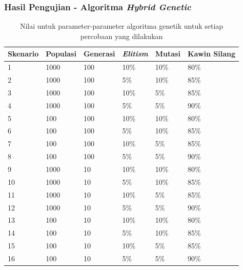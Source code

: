 \documentclass{beamer}
\begin{document}
\begin{frame}
\frametitle{Hasil Pengujian - Algoritma \textit{Hybrid Genetic}}
\begin{table}
\tiny
\centering
\captionsetup{justification=centering}
\caption[Nilai untuk parameter-parameter algoritma genetik untuk setiap percobaan yang dilakukan]{Nilai untuk parameter-parameter algoritma genetik untuk setiap percobaan yang dilakukan}
\begin{tabular}{| l | l | l | l | l | l |}
\hline
Skenario & Populasi & Generasi & \textit{Elitism} & Mutasi & Kawin Silang \\
\hline \hline
1 & 1000 & 100 & 10\% & 10\% & 80\% \\
\hline
2 & 1000 & 100 & 5\% & 10\% & 85\% \\
\hline
3 & 1000 & 100 & 10\% & 5\% & 85\% \\
\hline
4 & 1000 & 100 & 5\% & 5\% & 90\% \\
\hline
5 & 100 & 100 & 10\% & 10\% & 80\% \\
\hline
6 & 100 & 100 & 5\% & 10\% & 85\% \\
\hline
7 & 100 & 100 & 10\% & 5\% & 85\% \\
\hline
8 & 100 & 100 & 5\% & 5\% & 90\% \\
\hline
9 & 1000 & 10 & 10\% & 10\% & 80\% \\
\hline
10 & 1000 & 10 & 5\% & 10\% & 85\% \\
\hline
11 & 1000 & 10 & 10\% & 5\% & 85\% \\
\hline
12 & 1000 & 10 & 5\% & 5\% & 90\% \\
\hline
13 & 100 & 10 & 10\% & 10\% & 80\% \\
\hline
14 & 100 & 10 & 5\% & 10\% & 85\% \\
\hline
15 & 100 & 10 & 10\% & 5\% & 85\% \\
\hline
16 & 100 & 10 & 5\% & 5\% & 90\% \\
\hline
\end{tabular}
\label{tab:nilaiparameterhg}
\end{table}

\end{frame}

\note{

}
\end{document}
